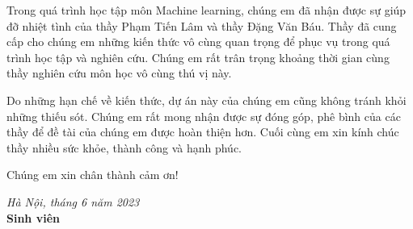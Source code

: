 
\begin{acknowledgements}
	\addchaptertocentry{\acknowledgementname}
	\thispagestyle{empty}
	
	Trong quá trình học tập môn Machine learning, chúng em đã nhận được sự giúp đỡ nhiệt tình của thầy Phạm Tiến Lâm và thầy Đặng Văn Báu. Thầy đã cung cấp cho chúng em những kiến thức vô cùng quan trọng để phục vụ trong quá trình học tập và nghiên cứu. Chúng em rất trân trọng khoảng thời gian cùng thầy nghiên cứu môn học vô cùng thú vị này. 
	
	Do những hạn chế về kiến thức, dự án này của chúng em cũng không tránh khỏi những thiếu sót. Chúng em rất mong nhận được sự đóng góp, phê bình của các thầy để đề tài của chúng em được hoàn thiện hơn. Cuối cùng em xin kính chúc thầy nhiều sức khỏe, thành công và hạnh phúc.
	
	Chúng em xin chân thành cảm ơn!
	
\end{acknowledgements}

\begin{flushright}
	\textit{Hà Nội, tháng 6 năm 2023}\hspace{0.5cm}
	\vspace{0.1cm}\\
	\textbf{Sinh viên}\hspace{2cm}
	\vspace{2cm}
\end{flushright}